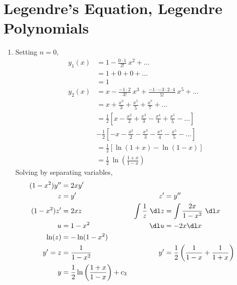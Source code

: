 \section{Legendre's Equation, Legendre Polynomials}
\begin{enumerate}
    \item Setting $ n=0 $,
          \begin{align}
              y_1(x) & = 1 - \frac{0 \cdot 1}{2!}\ x^2 + \dots                     \\
                     & = 1 + 0 + 0 + \dots                                         \\
                     & = 1                                                         \\
              y_2(x) & = x - \frac{-1 \cdot 2}{3!}\ x^3
              + \frac{-1 \cdot -3 \cdot 2 \cdot 4}{5!}\ x^5 + \dots                \\
                     & = x + \frac{x^3}{3} + \frac{x^5}{5} + \frac{x^7}{7} + \dots \\
                     & = \frac{1}{2}\left[ x - \frac{x^2}{2}
              + \frac{x^3}{3} - \frac{x^4}{4} + \frac{x^5}{5} - \dots \right]      \\
                     & - \frac{1}{2}\left[ -x - \frac{x^2}{2} - \frac{x^3}{3}
              - \frac{x^4}{4} - \frac{x^5}{5} - \dots \right]                      \\
                     & = \frac{1}{2} [\ln(1 + x) - \ln(1-x)]                       \\
                     & = \frac{1}{2}\ \ln \left( \frac{1+x}{1-x} \right)
          \end{align}
          Solving by separating variables,
          \begin{align}
              (1-x^2)y''              & = 2xy'                               \\
              z                       & = y'                               &
              z'                      & = y''                                \\
              (1-x^2)z'               & = 2xz                              &
              \int \frac{1}{z}\ \dl z & = \int \frac{2x}{1 - x^2}\ \dl x     \\
              u                       & = 1 - x^2                          &
              \dl u                   & = -2x \dl x                          \\
              \ln(z)                  & = -\ln(1 - x^2)                      \\
              y' = z                  & = \frac{1}{1-x^2}                  &
              y'                      & = \frac{1}{2} \left( \frac{1}{1-x}
              + \frac{1}{1+x} \right)                                        \\
              y                       & = \frac{1}{2} \ln \left(
              \frac{1+x}{1-x}\right) + c_3
          \end{align}


\end{enumerate}
